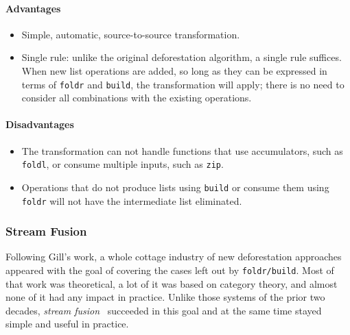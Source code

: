 \paragraph{Advantages}
\begin{itemize}
    \item Simple, automatic, source-to-source transformation.


    \item Single rule: unlike the original deforestation algorithm, a single
        rule suffices. When new list operations are added, so long as they can
        be expressed in terms of \texttt{foldr} and \texttt{build}, the
        transformation will apply; there is no need to consider all combinations
        with the existing operations.
\end{itemize}

\paragraph{Disadvantages}
\begin{itemize}
    \item The transformation can not handle functions that use accumulators,
        such as \texttt{foldl}, or consume multiple inputs, such as
        \texttt{zip}.

    \item Operations that do not produce lists using \texttt{build} or consume
        them using \texttt{foldr} will not have the intermediate list
        eliminated.
\end{itemize}


\subsubsection{Stream Fusion}

Following Gill's work, a whole cottage industry of new deforestation approaches
appeared with the goal of covering the cases left out by
\texttt{foldr/build}. Most of that work was
theoretical, a lot of it was based on category theory, and almost none of it had
any impact in practice. Unlike those systems of the prior two decades,
\emph{stream fusion}~\cite{Coutts:2007kp} succeeded in this
goal and at the same time stayed simple and useful in practice.

